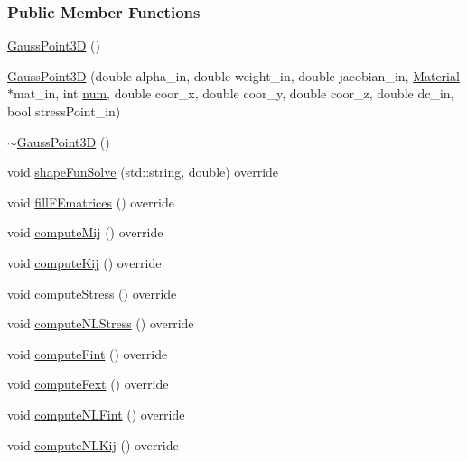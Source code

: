 \subsubsection*{Public Member Functions}
\begin{DoxyCompactItemize}
\item 
\hyperlink{classmknix_1_1_gauss_point3_d_abe2dcef9e8961558425ab2337a24820f}{Gauss\+Point3\+D} ()
\item 
\hyperlink{classmknix_1_1_gauss_point3_d_a5fa5d3e992afb0091d90721f255b9284}{Gauss\+Point3\+D} (double alpha\+\_\+in, double weight\+\_\+in, double jacobian\+\_\+in, \hyperlink{classmknix_1_1_material}{Material} $\ast$mat\+\_\+in, int \hyperlink{classmknix_1_1_gauss_point_a47cb3d74f927e150168f2052553cbea8}{num}, double coor\+\_\+x, double coor\+\_\+y, double coor\+\_\+z, double dc\+\_\+in, bool stress\+Point\+\_\+in)
\item 
\hyperlink{classmknix_1_1_gauss_point3_d_a7dfc2284285ebba829736a3ff9b867d3}{$\sim$\+Gauss\+Point3\+D} ()
\item 
void \hyperlink{classmknix_1_1_gauss_point3_d_aef6888ced250ce6d0eee3bd16570579c}{shape\+Fun\+Solve} (std\+::string, double) override
\item 
void \hyperlink{classmknix_1_1_gauss_point3_d_a16e2f4b6b77d15dc65e559cbddd9ac78}{fill\+F\+Ematrices} () override
\item 
void \hyperlink{classmknix_1_1_gauss_point3_d_a72549b797a46744d0a737e0d84075b66}{compute\+Mij} () override
\item 
void \hyperlink{classmknix_1_1_gauss_point3_d_ae9df1aabb0be56e262fa2de682443d03}{compute\+Kij} () override
\item 
void \hyperlink{classmknix_1_1_gauss_point3_d_afa3d26578c0ab96f01ac2eb84d2b7172}{compute\+Stress} () override
\item 
void \hyperlink{classmknix_1_1_gauss_point3_d_a3ba0e4b023f83054264e694402814b5a}{compute\+N\+L\+Stress} () override
\item 
void \hyperlink{classmknix_1_1_gauss_point3_d_a5a81d408afc7f05339c2ef2fe7aa374d}{compute\+Fint} () override
\item 
void \hyperlink{classmknix_1_1_gauss_point3_d_aa453d2f80fdd56eeae06864ae1538937}{compute\+Fext} () override
\item 
void \hyperlink{classmknix_1_1_gauss_point3_d_ae4554113fd952654ef65f1b2e74578b7}{compute\+N\+L\+Fint} () override
\item 
void \hyperlink{classmknix_1_1_gauss_point3_d_ab9cda3ea610065fb52c663811b38448f}{compute\+N\+L\+Kij} () override

\end{DoxyCompactItemize}
